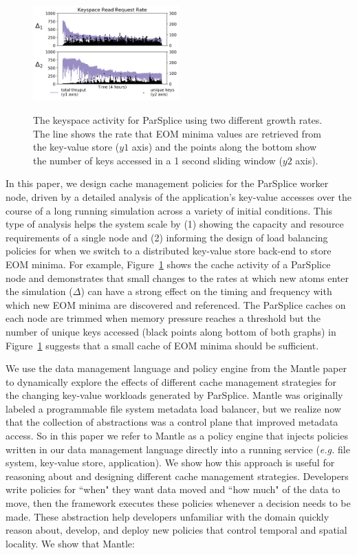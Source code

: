 \begin{figure}[t]
  \noindent\includegraphics[width=0.5\textwidth]{figures/motivation-regimes.png}\\
  \caption{The keyspace activity for ParSplice using two different growth
rates.  The line shows the rate that EOM minima values are retrieved from the
key-value store (\(y1\) axis) and the points along the bottom show the number
of keys accessed in a 1 second sliding window (\(y2\) axis).
\label{fig:motivation-regimes}}
\end{figure}

In this paper, we design cache management policies for the ParSplice worker
node, driven by a detailed analysis of the application's key-value accesses
over the course of a long running simulation across a variety of initial
conditions.  This type of analysis helps the system scale by (1) showing the
capacity and resource requirements of a single node and (2) informing the
design of load balancing policies for when we switch to a distributed key-value
store back-end to store EOM minima.  For example,
Figure~\ref{fig:motivation-regimes} shows the cache activity of a ParSplice
node and demonstrates that small changes to the rates at which new atoms enter
the simulation (\(\Delta\)) can have a strong effect on the timing and
frequency with which new EOM minima are discovered and referenced.  The
ParSplice caches on each node are trimmed when memory pressure reaches a
threshold but the number of unique keys accessed (black points along bottom of
both graphs) in Figure~\ref{fig:motivation-regimes} suggests that a small cache
of EOM minima should be sufficient. 

We use the data management language and policy engine from the Mantle
paper~\cite{sevilla:sc15-mantle} to dynamically explore the effects of
different cache management strategies for the changing key-value workloads
generated by ParSplice.  Mantle was originally labeled a programmable file
system metadata load balancer, but we realize now that the collection of
abstractions was a control plane that improved metadata access. So in this
paper we refer to Mantle as a policy engine that injects policies written in
our data management language directly into a running service ({\it e.g.} file
system, key-value store, application).  We show how this approach is useful for
reasoning about and designing different cache management strategies.
Developers write policies for ``when" they want data moved and ``how much" of
the data to move, then the framework executes these policies whenever a
decision needs to be made.  These abstraction help developers unfamiliar with
the domain quickly reason about, develop, and deploy new policies that control
temporal and spatial locality. We show that Mantle:

